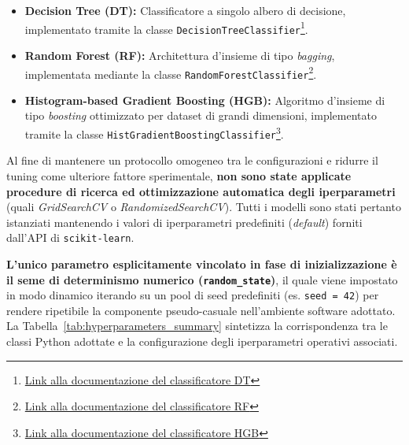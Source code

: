 \begin{itemize}
    \item \textbf{Decision Tree (DT):} Classificatore a singolo albero di decisione, implementato tramite la classe \texttt{DecisionTreeClassifier}\footnote{\href{https://scikit-learn.org/stable/modules/generated/sklearn.tree.DecisionTreeClassifier}{Link alla documentazione del classificatore DT}}.
    \item \textbf{Random Forest (RF):} Architettura d'insieme di tipo \textit{bagging}, implementata mediante la classe \texttt{RandomForestClassifier}\footnote{\href{https://scikit-learn.org/stable/modules/generated/sklearn.ensemble.RandomForestClassifier}{Link alla documentazione del classificatore RF}}.
    \item \textbf{Histogram-based Gradient Boosting (HGB):} Algoritmo d'insieme di tipo \textit{boosting} ottimizzato per dataset di grandi dimensioni, implementato tramite la classe \newline \texttt{HistGradientBoostingClassifier}\footnote{\href{https://scikit-learn.org/stable/modules/generated/sklearn.ensemble.HistGradientBoostingClassifier}{Link alla documentazione del classificatore HGB}}.
\end{itemize}

Al fine di mantenere un protocollo omogeneo tra le configurazioni e ridurre il tuning come ulteriore fattore sperimentale, \textbf{non sono state applicate procedure di ricerca ed ottimizzazione automatica degli iperparametri} (quali \textit{GridSearchCV} o \textit{RandomizedSearchCV}). 
Tutti i modelli sono stati pertanto istanziati mantenendo i valori di iperparametri predefiniti (\textit{default}) forniti dall'API di \texttt{scikit-learn}. 

\textbf{L'unico parametro esplicitamente vincolato in fase di inizializzazione è il seme di determinismo numerico (\texttt{random\_state})}, il quale viene impostato in modo dinamico iterando su un pool di seed predefiniti (es. \texttt{seed = 42}) per rendere ripetibile la componente pseudo-casuale nell'ambiente software adottato. 
La Tabella~\ref{tab:hyperparameters_summary} sintetizza la corrispondenza tra le classi Python adottate e la configurazione degli iperparametri operativi associati.

